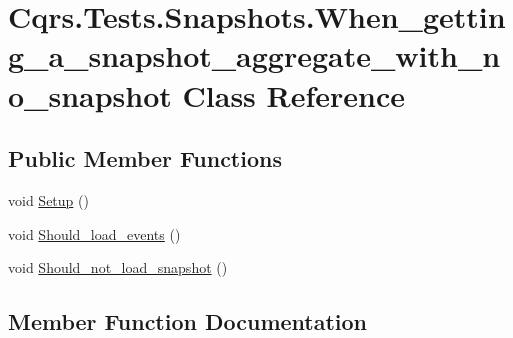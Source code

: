 \hypertarget{classCqrs_1_1Tests_1_1Snapshots_1_1When__getting__a__snapshot__aggregate__with__no__snapshot}{}\section{Cqrs.\+Tests.\+Snapshots.\+When\+\_\+getting\+\_\+a\+\_\+snapshot\+\_\+aggregate\+\_\+with\+\_\+no\+\_\+snapshot Class Reference}
\label{classCqrs_1_1Tests_1_1Snapshots_1_1When__getting__a__snapshot__aggregate__with__no__snapshot}
\subsection*{Public Member Functions}
\begin{DoxyCompactItemize}
\item 
void \hyperlink{classCqrs_1_1Tests_1_1Snapshots_1_1When__getting__a__snapshot__aggregate__with__no__snapshot_a7ba942e00386ad7ec0522ab3c405d04b}{Setup} ()
\item 
void \hyperlink{classCqrs_1_1Tests_1_1Snapshots_1_1When__getting__a__snapshot__aggregate__with__no__snapshot_aebcd835889fdf9cfcdbcf31b946d38e5}{Should\+\_\+load\+\_\+events} ()
\item 
void \hyperlink{classCqrs_1_1Tests_1_1Snapshots_1_1When__getting__a__snapshot__aggregate__with__no__snapshot_af4f1419e48252c91612df85754d9e413}{Should\+\_\+not\+\_\+load\+\_\+snapshot} ()
\end{DoxyCompactItemize}


\subsection{Member Function Documentation}
\mbox{\label{classCqrs_1_1Tests_1_1Snapshots_1_1When__getting__a__snapshot__aggregate__with__no__snapshot_a7ba942e00386ad7ec0522ab3c405d04b}} 
